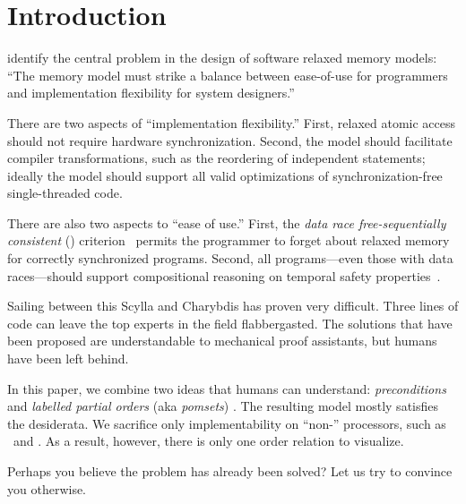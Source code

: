 \section{Introduction}
\label{sec:intro}
\citet{Manson:2005:JMM:1047659.1040336} identify the central problem in the
design of software relaxed memory models: ``The memory model must strike a
balance between ease-of-use for programmers and implementation flexibility
for system designers.''  


There are two aspects of ``implementation flexibility.''  First, relaxed
atomic access should not require hardware synchronization.  Second, the model
should facilitate compiler transformations, such as the reordering of independent
statements; ideally the model should support all valid optimizations of
synchronization\hyp{}free single\hyp{}threaded code.

There are also two aspects to ``ease of use.''  First, the \emph{data race
  free-sequentially consistent} (\drfsc)
criterion~\cite{DBLP:journals/tpds/AdveH93, DBLP:conf/isca/AdveH90} permits
the programmer to forget about relaxed memory for correctly synchronized
programs.  Second, all programs---even those with data races---should support
compositional reasoning on temporal safety
properties~\cite{PnueliSafety,Misra:1981:PNP:1313338.1313770,StarkSafety,Abadi:1993:CS:151646.151649}.

Sailing between this Scylla and Charybdis has proven very difficult.  Three
lines of code can leave the top experts in the field flabbergasted.  The
solutions that have been proposed are understandable to mechanical proof
assistants, but humans have been left behind.

In this paper, we combine two ideas that humans can understand: \emph{preconditions}
\cite{Hoare:1969:ABC:363235.363259} and \emph{labelled partial orders} (aka \emph{pomsets})
\cite{GISCHER1988199,Plotkin:1997:TSP:266557.266600}.  The resulting model
mostly satisfies the desiderata.  We sacrifice only implementability on
``non-\mca'' processors, such as \ppc\ and \armseven{}. As a result, however,
there is only one order relation to visualize.

Perhaps you believe the problem has already been solved?  Let us try to
convince you otherwise.

